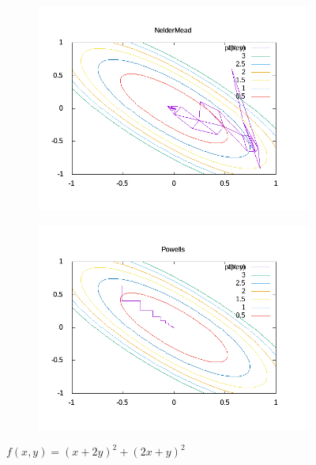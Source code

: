 \documentclass[12pt,letterpaper]{article}
\begin{document}
\begin{enumerate}
\newpage
\begin{figure}
  \centering
  \begin{subfigure}[b]{0.45\textwidth}
    \centering
    \includegraphics[width=\textwidth]{figures/NelderMead_0.png}
  \end{subfigure}
  \hfill
  \begin{subfigure}[b]{0.45\textwidth}
    \centering
    \includegraphics[width=\textwidth]{figures/Powells_0.png}
  \end{subfigure}
    \caption{$f(x, y)=(x+2y)^2 + (2x+y)^2$ }
\end{figure}


\end{enumerate}
\end{document}
